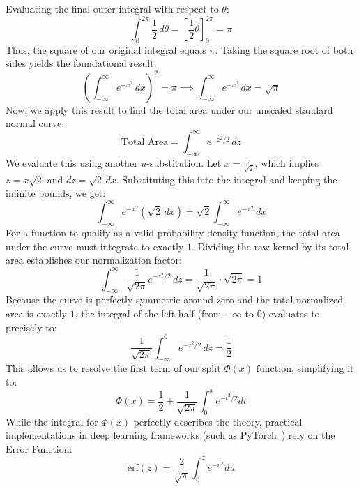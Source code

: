 \documentclass[11pt]{article}
\begin{document}
Evaluating the final outer integral with respect to $\theta$:
\begin{equation*}
\int_0^{2\pi} \frac{1}{2} \, d\theta = \left[ \frac{1}{2}\theta \right]_0^{2\pi} = \pi
\end{equation*}
Thus, the square of our original integral equals $\pi$. Taking the square root of both sides yields the foundational result:
\begin{equation*}
\left( \int_{-\infty}^{\infty} e^{-x^2} \, dx \right)^2 = \pi \implies \int_{-\infty}^{\infty} e^{-x^2} \, dx = \sqrt{\pi}
\end{equation*}
Now, we apply this result to find the total area under our unscaled standard normal curve:
\begin{equation*}
\text{Total Area} = \int_{-\infty}^{\infty} e^{-z^2/2} \, dz
\end{equation*}
We evaluate this using another $u$-substitution. Let $x = \frac{z}{\sqrt{2}}$, which implies $z = x\sqrt{2}$ and $dz = \sqrt{2} \, dx$. Substituting this into the integral and keeping the infinite bounds, we get:
\begin{equation*}
\int_{-\infty}^{\infty} e^{-x^2} (\sqrt{2} \, dx) = \sqrt{2} \int_{-\infty}^{\infty} e^{-x^2} \, dx
\end{equation*}
For a function to qualify as a valid probability density function, the total area under the curve must integrate to exactly $1$. Dividing the raw kernel by its total area establishes our normalization factor:
\begin{equation*}
\int_{-\infty}^{\infty} \dfrac{1}{\sqrt{2\pi}} e^{-z^2/2} \, dz = \dfrac{1}{\sqrt{2\pi}} \cdot \sqrt{2\pi} = 1
\end{equation*}
Because the curve is perfectly symmetric around zero and the total normalized area is exactly $1$, the integral of the left half (from $-\infty$ to $0$) evaluates to precisely to:
\begin{equation*}
\dfrac{1}{\sqrt{2\pi}} \int_{-\infty}^{0} e^{-z^2/2} \, dz = \dfrac{1}{2}
\end{equation*}
This allows us to resolve the first term of our split $\Phi(x)$ function, simplifying it to:
\begin{equation*}
\Phi(x) = \frac{1}{2} + \frac{1}{\sqrt{2\pi}} \int_{0}^{x} e^{-t^2/2} dt
\end{equation*}
While the integral for $\Phi(x)$ perfectly describes the theory, practical implementations in deep learning frameworks (such as PyTorch~\cite{paszke2017automatic}) rely on the Error Function:
\begin{equation*}
\text{erf}(z) = \dfrac{2}{\sqrt{\pi}}\int_{0}^{z} e^{-u^{2}}du
\end{equation*}
\end{document}
